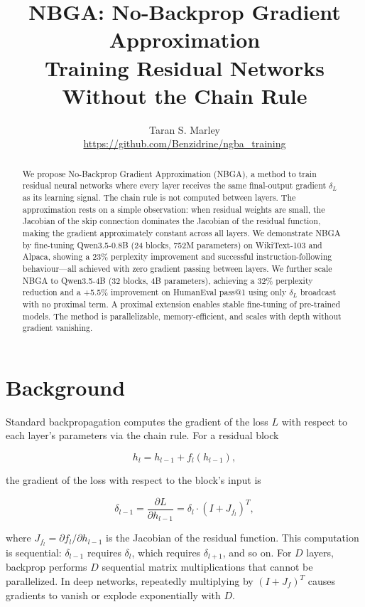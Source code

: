 \documentclass[11pt]{article}
\title{NBGA: No-Backprop Gradient Approximation\\Training Residual Networks Without the Chain Rule}
\author{Taran S. Marley\\[4pt]\small\url{https://github.com/Benzidrine/ngba_training}}
\date{}
\begin{document}
\maketitle

\begin{abstract}
We propose No-Backprop Gradient Approximation (NBGA), a method to train residual neural networks where every layer receives the same final-output gradient $\delta_L$ as its learning signal. The chain rule is not computed between layers. The approximation rests on a simple observation: when residual weights are small, the Jacobian of the skip connection dominates the Jacobian of the residual function, making the gradient approximately constant across all layers. We demonstrate NBGA by fine-tuning Qwen3.5-0.8B (24 blocks, 752M parameters) on WikiText-103 and Alpaca, showing a 23\% perplexity improvement and successful instruction-following behaviour---all achieved with zero gradient passing between layers. We further scale NBGA to Qwen3.5-4B (32 blocks, 4B parameters), achieving a 32\% perplexity reduction and a +5.5\% improvement on HumanEval pass@1 using only $\delta_L$ broadcast with no proximal term. A proximal extension enables stable fine-tuning of pre-trained models. The method is parallelizable, memory-efficient, and scales with depth without gradient vanishing.
\end{abstract}

\section{Background}

Standard backpropagation computes the gradient of the loss $L$ with respect to each layer's parameters via the chain rule. For a residual block

\[
h_{l} = h_{l-1} + f_l(h_{l-1}),
\]

the gradient of the loss with respect to the block's input is

\[
\delta_{l-1} = \frac{\partial L}{\partial h_{l-1}} = \delta_l \cdot (I + J_{f_l})^T,
\]

where $J_{f_l} = \partial f_l / \partial h_{l-1}$ is the Jacobian of the residual function. This computation is sequential: $\delta_{l-1}$ requires $\delta_l$, which requires $\delta_{l+1}$, and so on. For $D$ layers, backprop performs $D$ sequential matrix multiplications that cannot be parallelized. In deep networks, repeatedly multiplying by $(I + J_f)^T$ causes gradients to vanish or explode exponentially with $D$.
\end{document}
